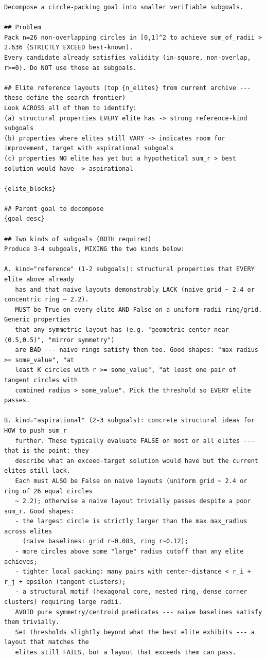 \begin{ttcolorbox}
\begin{lstlisting}[style=prompt]
Decompose a circle-packing goal into smaller verifiable subgoals.

## Problem
Pack n=26 non-overlapping circles in [0,1]^2 to achieve sum_of_radii > 2.636 (STRICTLY EXCEED best-known).
Every candidate already satisfies validity (in-square, non-overlap, r>=0). Do NOT use those as subgoals.

## Elite reference layouts (top {n_elites} from current archive --- these define the search frontier)
Look ACROSS all of them to identify:
(a) structural properties EVERY elite has -> strong reference-kind subgoals
(b) properties where elites still VARY -> indicates room for improvement, target with aspirational subgoals
(c) properties NO elite has yet but a hypothetical sum_r > best solution would have -> aspirational

{elite_blocks}

## Parent goal to decompose
{goal_desc}

## Two kinds of subgoals (BOTH required)
Produce 3-4 subgoals, MIXING the two kinds below:

A. kind="reference" (1-2 subgoals): structural properties that EVERY elite above already
   has and that naive layouts demonstrably LACK (naive grid ~ 2.4 or concentric ring ~ 2.2).
   MUST be True on every elite AND False on a uniform-radii ring/grid. Generic properties
   that any symmetric layout has (e.g. "geometric center near (0.5,0.5)", "mirror symmetry")
   are BAD --- naive rings satisfy them too. Good shapes: "max radius >= some_value", "at
   least K circles with r >= some_value", "at least one pair of tangent circles with
   combined radius > some_value". Pick the threshold so EVERY elite passes.

B. kind="aspirational" (2-3 subgoals): concrete structural ideas for HOW to push sum_r
   further. These typically evaluate FALSE on most or all elites --- that is the point: they
   describe what an exceed-target solution would have but the current elites still lack.
   Each must ALSO be False on naive layouts (uniform grid ~ 2.4 or ring of 26 equal circles
   ~ 2.2); otherwise a naive layout trivially passes despite a poor sum_r. Good shapes:
   - the largest circle is strictly larger than the max max_radius across elites
     (naive baselines: grid r~0.083, ring r~0.12);
   - more circles above some "large" radius cutoff than any elite achieves;
   - tighter local packing: many pairs with center-distance < r_i + r_j + epsilon (tangent clusters);
   - a structural motif (hexagonal core, nested ring, dense corner clusters) requiring large radii.
   AVOID pure symmetry/centroid predicates --- naive baselines satisfy them trivially.
   Set thresholds slightly beyond what the best elite exhibits --- a layout that matches the
   elites still FAILS, but a layout that exceeds them can pass.


\end{lstlisting}
\end{ttcolorbox}
